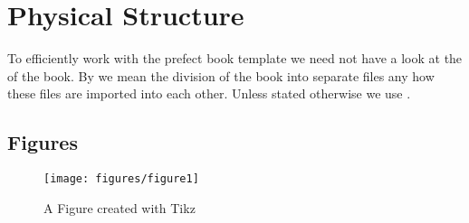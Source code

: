 \documentclass[latexsweetspot.tex]{subfiles}
\begin{document}
\chapter{Physical Structure}
To efficiently work with the prefect book template we need not have a look at
the  of the book.
By  we mean the division of the book into separate files any how these
files are imported into each other.
Unless stated otherwise we use .
\section{Figures}
\begin{figure}
	\texttt{[image: figures/figure1]}
	\caption{A Figure created with Tikz}
	\label{fig:figure1}
\end{figure}
\end{document}
